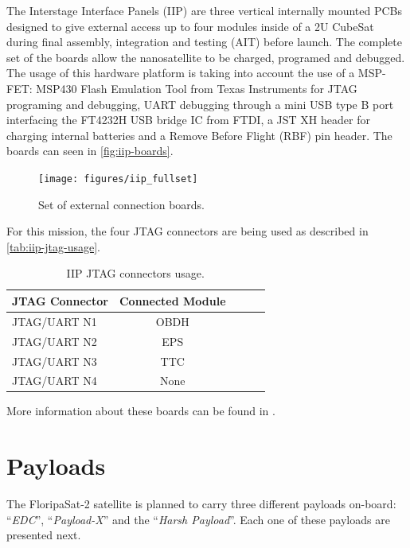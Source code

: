 The Interstage Interface Panels (IIP) are three vertical internally mounted PCBs designed to give external access up to four modules inside of a 2U CubeSat during final assembly, integration and testing (AIT) before launch. The complete set of the boards allow the nanosatellite to be charged, programed and debugged. The usage of this hardware platform is taking into account the use of a MSP-FET: MSP430 Flash Emulation Tool from Texas Instruments for JTAG programing and debugging, UART debugging through a mini USB type B port interfacing the FT4232H USB bridge IC from FTDI, a JST XH header for charging internal batteries and a Remove Before Flight (RBF) pin header. The boards can seen in \autoref{fig:iip-boards}.

\begin{figure}[!ht]
    \begin{center}
        \texttt{[image: figures/iip\_fullset]}
        \caption{Set of external connection boards.}
        \label{fig:iip-boards}
    \end{center}
\end{figure}

For this mission, the four JTAG connectors are being used as described in \autoref{tab:iip-jtag-usage}.

\begin{table}[!h]
    \centering
    \begin{tabular}{lcccc}
        \toprule[1.5pt]
        \textbf{JTAG Connector} & \textbf{Connected Module} \\
        \midrule
        JTAG/UART N1 & OBDH \\
        JTAG/UART N2 & EPS \\
        JTAG/UART N3 & TTC \\
        JTAG/UART N4 & None \\
        \bottomrule[1.5pt]
    \end{tabular}
    \caption{IIP JTAG connectors usage.}
    \label{tab:iip-jtag-usage}
\end{table}

More information about these boards can be found in \cite{iip}.

\section{Payloads}

The FloripaSat-2 satellite is planned to carry three different payloads on-board: ``\textit{EDC}'', ``\textit{Payload-X}'' and the ``\textit{Harsh Payload}''. Each one of these payloads are presented next.

